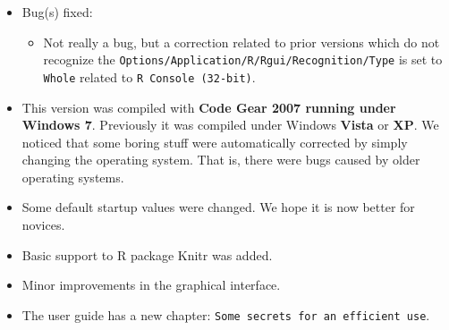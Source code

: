 \begin{itemize}
  \item Bug(s) fixed:
    \begin{itemize}
      \item Not really a bug, but a correction related to prior versions which do not recognize
        the \texttt{Options/Application/R/Rgui/Recognition/Type} is set to \texttt{Whole} related to \texttt{R Console (32-bit)}.
    \end{itemize}
  \item This version was compiled with \textbf{Code Gear 2007 running under Windows 7}.
    Previously it was compiled under Windows \textbf{Vista} or \textbf{XP}.
    We noticed that some boring stuff were automatically corrected by simply changing the operating system.
    That is, there were bugs caused by older operating systems.
  \item Some default startup values were changed. We hope it is now better for novices.
  \item Basic support to R package Knitr was added.
  \item Minor improvements in the graphical interface.
  \item The user guide has a new chapter: \texttt{Some secrets for an efficient use}.
\end{itemize}
